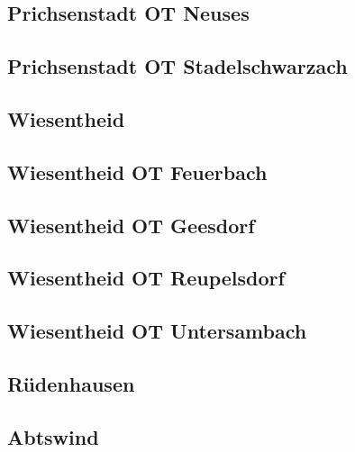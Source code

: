 \documentclass[fontsize=12pt,a4paper]{scrreprt}
\begin{document}
        \subsection{Prichsenstadt OT Neuses}
        

        \subsection{Prichsenstadt OT Stadelschwarzach}
        

        \subsection{Wiesentheid}
        

        \subsection{Wiesentheid OT Feuerbach}
        

        \subsection{Wiesentheid OT Geesdorf}
        

        \subsection{Wiesentheid OT Reupelsdorf}
        

        \subsection{Wiesentheid OT Untersambach}
        

        \subsection{Rüdenhausen}
        

        \subsection{Abtswind}
        
\end{document}
